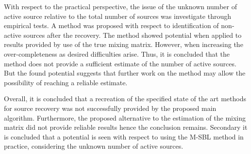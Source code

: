 With respect to the practical perspective, the issue of the unknown number of active source relative to the total number of sources was investigate through empirical tests. A method was proposed with respect to identification of non-active sources after the recovery. The method showed potential when applied to results provided by use of the true mixing matrix. However, when increasing the over-completeness as desired difficulties arise. Thus, it is concluded that the method does not provide a sufficient estimate of the number of active sources. But the found potential suggests that further work on the method may allow the possibility of reaching a reliable estimate. 

Overall, it is concluded that a recreation of the specified state of the art methods for source recovery was not successfully provided by the proposed main algorithm. Furthermore, the proposed alternative to the estimation of the mixing matrix did not provide reliable results hence the conclusion remains. 
Secondary it is concluded that a potential is seen with respect to using the M-SBL method in practice, considering the unknown number of active sources. 
